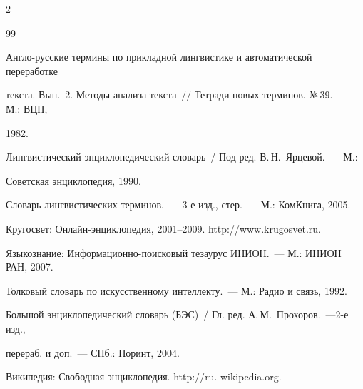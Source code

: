 \begin{multicols}{2}
{{\begin{thebibliography}{99}
  



  Англо-русские термины по прикладной лингвистике и автоматической переработке 

текста. Вып.~2. Методы анализа текста~// Тетради новых терминов. №\,39.~--- М.: ВЦП, 

1982.

  


  Лингвистический энциклопедический словарь~/ Под ред. В.\,Н.~Ярцевой.~--- М.: 

Советская энциклопедия, 1990. 





Словарь лингвистических терминов.~--- 3-е изд., стер.~--- М.: КомКнига, 2005. 

  


  Кругосвет: Онлайн-энциклопедия, 2001--2009. {\sf http://www.krugosvet.ru}.

  


  Языкознание: Информационно-поисковый тезаурус ИНИОН.~--- М.: ИНИОН РАН, 2007.

  



  Толковый словарь по искусственному интеллекту.~--- М.: Радио и связь, 1992.

  


  Большой энциклопедический словарь (БЭС)~/ Гл. ред. А.\,М.~Прохоров.~---2-е изд., 

перераб. и доп.~--- СПб.: Норинт, 2004. 

  


  Википедия: Свободная энциклопедия. {\sf http://ru. wikipedia.org}.

  




\end{thebibliography}}}
\end{multicols}
